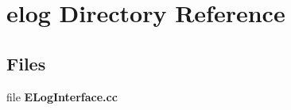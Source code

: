 \section{elog Directory Reference}
\label{dir_7ba045da2dcf3b8c0f71a06d7d21ab6f}
\subsection*{Files}
\begin{DoxyCompactItemize}
\item 
file {\bf E\+Log\+Interface.\+cc}
\end{DoxyCompactItemize}

